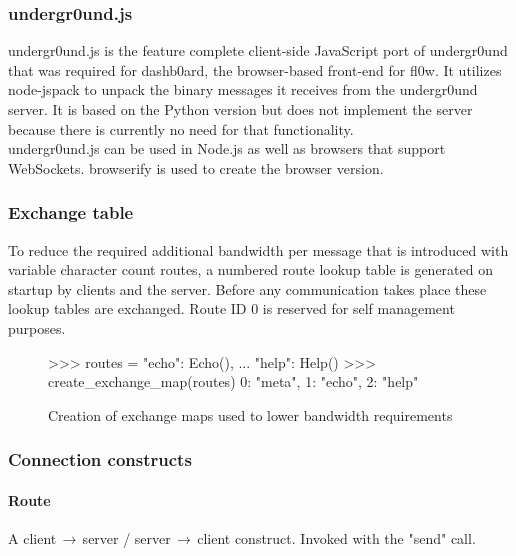 \documentclass[conference,a4paper]{IEEEtran}
\begin{document}
\subsubsection{undergr0und.js}
undergr0und.js\cite{undergr0und.js:Philip Trauner} is the feature complete client-side JavaScript port of undergr0und that was required for dashb0ard\cite{dashb0ard:Sebastian Schaffler}, the browser-based front-end for fl0w. It utilizes node-jspack\cite{node-jspack:Peter Griess} to unpack the binary messages it receives from the undergr0und server. It is based on the Python version but does not implement the server because there is currently no need for that functionality. \\undergr0und.js can be used in Node.js\cite{Node.js:Node.js Foundation} as well as browsers that support WebSockets. browserify\cite{browserify:James Halliday} is used to create the browser version.\\

\subsubsection{Exchange table}
To reduce the required additional bandwidth per message that is introduced with variable character count routes, a numbered route lookup table is generated on startup by clients and the server. Before any communication takes place these lookup tables are exchanged. Route ID 0 is reserved for self management purposes.\\

\begin{figure}[H]
\centering
\begin{python}
>>> routes = {"echo": Echo(),
...    "help": Help()}
>>> create_exchange_map(routes)
{0: "meta", 1: "echo", 2: "help"}
\end{python}
\caption{Creation of exchange maps used to lower bandwidth requirements}
\end{figure}

\subsubsection{Connection constructs}
\paragraph{Route}
A client$\,\to\,$server / server$\,\to\,$client construct. Invoked with the {\color{deepgreen}"send"} call.
\end{document}
